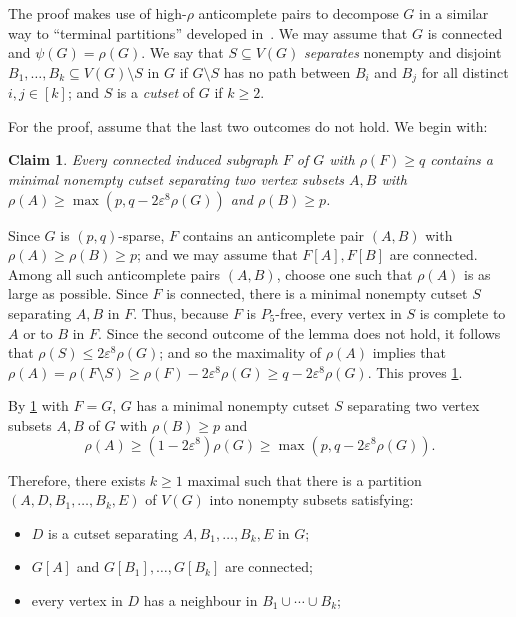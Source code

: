\documentclass[11pt,reqno]{amsart}
\newtheorem{claim}{Claim}[theorem]
\let\oldendproof\endproof
\renewenvironment{proof}[1][\proofname]{%
	\oldproof[\normalfont\bfseries #1]%
}{\oldendproof}
\renewcommand{\qedsymbol}{$\blacksquare$}%
\newenvironment{subproof}[1][\normalfont\it Subproof]{%
	\renewcommand{\qedsymbol}{$\square$}%
	\begin{proof}[#1]%
	}{%
	\end{proof}%
}
\newcommand{\dd}{\textquotedblleft}
\newcommand{\ee}{\textquotedblright}
\newcommand{\eps}{\varepsilon}
\renewcommand{\subset}{\subseteq}
\begin{document}
	\begin{proof}
		The proof makes use of high-$\rho$ anticomplete pairs to decompose $G$ in a similar way to \dd terminal partitions\ee{} developed in~\cite[Section 4]{2024p5}.
		We may assume that $G$ is connected and $\psi(G)=\rho(G)$.
		We say that $S\subset V(G)$ {\em separates} nonempty and disjoint $B_1,\ldots,B_k\subset V(G)\setminus S$ in $G$ if $G\setminus S$ has no path between $B_i$  and $B_j$ for all distinct $i,j\in[k]$; and $S$ is a {\em cutset} of $G$ if $k\ge2$.
		
		For the proof, assume that the last two outcomes do not hold.
		We begin with:
		\begin{claim}
			\label{claim:sparse}
			Every connected induced subgraph $F$ of $G$ with $\rho(F)\ge q$ contains a minimal nonempty cutset separating two vertex subsets $A,B$ with $\rho(A)\ge \max(p,q-2\eps^8\rho(G))$ and $\rho(B)\ge p$.  
		\end{claim}
		\begin{subproof}
			Since $G$ is $(p,q)$-sparse, $F$ contains an anticomplete pair $(A,B)$ with $\rho(A)\ge\rho(B)\ge p$; and we may assume that $F[A],F[B]$ are connected.
			Among all such anticomplete pairs $(A,B)$, choose one such that $\rho(A)$ is as large as possible.
			Since $F$ is connected, there is a minimal nonempty cutset $S$ separating $A,B$ in $F$.
			Thus, because $F$ is $P_5$-free, every vertex in $S$ is complete to $A$ or to $B$ in $F$.
			Since the second outcome of the lemma does not hold, it follows that $\rho(S)\le 2\eps^8\rho(G)$; and so the maximality of $\rho(A)$ implies that
			$\rho(A)=\rho(F\setminus S)\ge \rho(F)-2\eps^8\rho(G)\ge q-2\eps^8\rho(G)$.
			This proves \cref{claim:sparse}.
		\end{subproof}
		
		By \cref{claim:sparse} with $F=G$, $G$ has a minimal nonempty cutset $S$ separating two vertex subsets $A,B$ of $G$ with $\rho(B)\ge p$ and
		\[\rho(A)\ge(1-2\eps^8)\rho(G)\ge \max(p,q-2\eps^8\rho(G)).\]
		
		Therefore, there exists $k\ge1$ maximal such that there is a partition $(A,D,B_1,\ldots,B_k,E)$ of $V(G)$ into nonempty subsets satisfying:
		\begin{itemize}
			\item $D$ is a cutset separating $A,B_1,\ldots,B_k,E$ in $G$;
			
			\item $G[A]$ and $G[B_1],\ldots,G[B_k]$ are connected;
			
			\item every vertex in $D$ has a neighbour in $B_1\cup\cdots\cup B_k$;
			

\end{itemize}
\end{proof}
\end{document}
